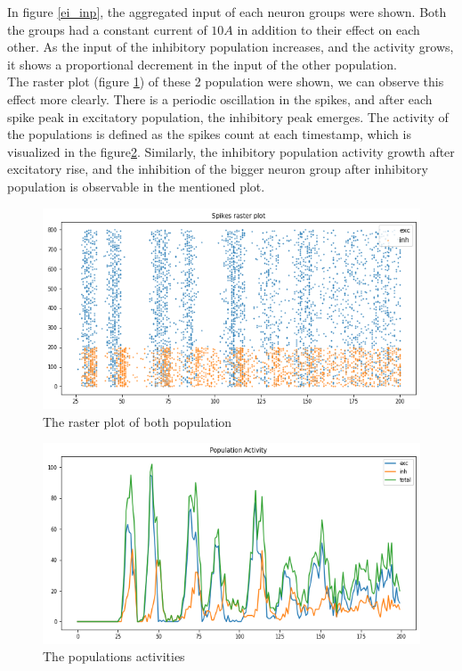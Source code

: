 \documentclass{article}
\begin{document}
	In figure \ref{ei_inp}, the aggregated input of each neuron groups were shown. Both the groups had a constant current of $10A$ in addition to their effect on each other. As the input of the inhibitory population increases, and the activity grows, it shows a proportional decrement in the input of the other population. \\
	
	The raster plot (figure \ref{raster1}) of these 2 population were shown, we can observe this effect more clearly. There is a periodic oscillation in the spikes, and after each spike peak in excitatory population, the inhibitory peak emerges. The activity of the populations is defined as the spikes count at each timestamp, which is visualized in the figure\ref{popAct}. Similarly, the inhibitory population activity growth after excitatory rise, and the inhibition of the bigger neuron group after inhibitory population is observable in the mentioned plot.\\
	
	
	\begin{figure}[h]
		\includegraphics[width=\textwidth]{raster1.png}
		\caption{The raster plot of both population}
		\label{raster1}
	\end{figure}
	
	\begin{figure}[h]
		\includegraphics[width=\textwidth]{popAct.png}
		\caption{The populations activities}
		\label{popAct}
	\end{figure}
	
\end{document}
